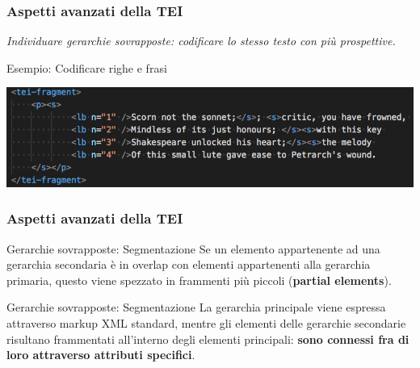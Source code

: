     \begin{frame}
        \frametitle{Aspetti avanzati della TEI}
        \addtocounter{nframe}{1}
        
    \textit{Individuare gerarchie sovrapposte: codificare lo stesso testo con più prospettive.}

        \begin{block}{Esempio: Codificare righe e frasi}
            \begin{center}
                \includegraphics[width=.97\textwidth]{imgs/frasi-righe.png}
            \end{center}
        \end{block}
        
    \end{frame}

    \begin{frame}
        \frametitle{Aspetti avanzati della TEI}
        \addtocounter{nframe}{1}
        

        \begin{block}{Gerarchie sovrapposte: Segmentazione}
             Se un elemento appartenente ad una gerarchia secondaria è in overlap con elementi appartenenti alla gerarchia primaria, questo viene spezzato in frammenti più piccoli (\textbf{partial elements}).
        \end{block}

        \begin{block}{Gerarchie sovrapposte: Segmentazione}
            La gerarchia principale viene espressa attraverso markup XML standard, mentre gli elementi delle gerarchie secondarie risultano frammentati all'interno degli elementi principali: \textbf{sono connessi fra di loro attraverso attributi specifici}.
        \end{block}
        
    \end{frame}

